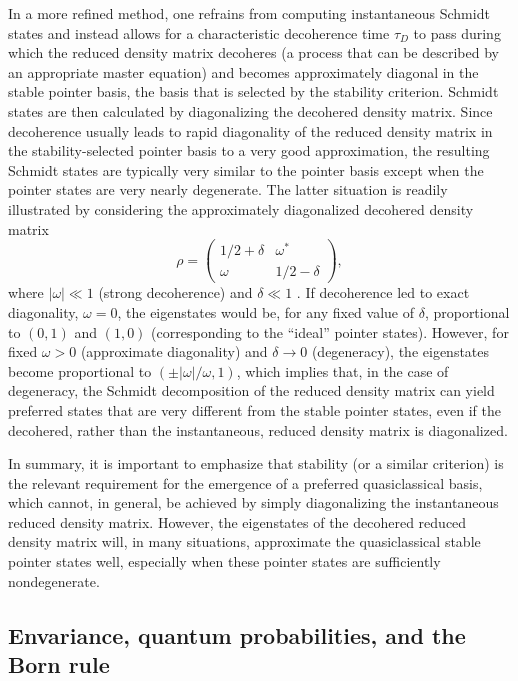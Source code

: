 \documentclass[twocolumn,rmp,aps,amsmath,amsfonts,noshowkeys,noshowpacs]{revtex4}
\begin{document}
In a more refined method, one refrains from computing instantaneous
Schmidt states and instead allows for a characteristic decoherence
time $\tau_D$ to pass during which the reduced density matrix
decoheres (a process that can be described by an appropriate master
equation) and becomes approximately diagonal in the stable pointer
basis, the basis that is selected by the stability criterion.  Schmidt
states are then calculated by diagonalizing the decohered density
matrix.  Since decoherence usually leads to rapid diagonality of the
reduced density matrix in the stability-selected pointer basis to a
very good approximation, the resulting Schmidt states are typically
very similar to the pointer basis except when the pointer states are
very nearly degenerate. The latter situation is readily illustrated by
considering the approximately diagonalized decohered density matrix
%
\begin{equation} 
\rho = \left( \begin{array}{cc}
    1/2 + \delta & \omega^* \\
    \omega & 1/2 - \delta
\end{array} \right),
\end{equation}
%
where $|\omega| \ll 1$ (strong decoherence) and $\delta \ll 1$
\citep[near-degeneracy;][]{Albrecht:1993:pq}. If decoherence led to
exact diagonality, $\omega = 0$, the eigenstates would be, for any
fixed value of $\delta$, proportional to $(0,1)$ and $(1,0)$
(corresponding to the ``ideal'' pointer states).  However, for fixed
$\omega > 0$ (approximate diagonality) and $\delta \rightarrow 0$
(degeneracy), the eigenstates become proportional to $(\pm
|\omega| / \omega, 1)$, which implies that, in the case of
degeneracy, the Schmidt decomposition of the reduced density matrix can
yield preferred states that are very different from the stable pointer
states, even if the decohered, rather than the instantaneous, reduced
density matrix is diagonalized.

In summary, it is important to emphasize that stability (or a similar
criterion) is the relevant requirement for the emergence of a
preferred quasiclassical basis, which cannot, in general, be achieved
by simply diagonalizing the instantaneous reduced density matrix.
However, the eigenstates of the decohered reduced density matrix will,
in many situations, approximate the quasiclassical stable pointer
states well, especially when these pointer states are sufficiently
nondegenerate.


\subsection{Envariance, quantum probabilities, and the Born rule \label{sec:envar}}
\end{document}
